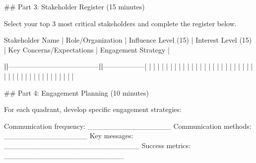 \documentclass[letterpaper,10pt,english]{sphinxmanual}
\begin{document}
\sphinxAtStartPar
\#\# Part 3: Stakeholder Register (15 minutes)

\sphinxAtStartPar
{} Select your top 3 most critical stakeholders and complete the register below.

\begin{DUlineblock}{0em}
\item[] Stakeholder Name | Role/Organization | Influence Level (1\sphinxhyphen{}5) | Interest Level (1\sphinxhyphen{}5) | Key Concerns/Expectations | Engagement Strategy |
\end{DUlineblock}

\sphinxAtStartPar
{\color{red}\bfseries{}|\sphinxhyphen{}\sphinxhyphen{}\sphinxhyphen{}\sphinxhyphen{}\sphinxhyphen{}\sphinxhyphen{}\sphinxhyphen{}\sphinxhyphen{}\sphinxhyphen{}\sphinxhyphen{}\sphinxhyphen{}\sphinxhyphen{}\sphinxhyphen{}\sphinxhyphen{}\sphinxhyphen{}\sphinxhyphen{}\sphinxhyphen{}\sphinxhyphen{}|}——————\sphinxhyphen{}{\color{red}\bfseries{}|\sphinxhyphen{}\sphinxhyphen{}\sphinxhyphen{}\sphinxhyphen{}\sphinxhyphen{}\sphinxhyphen{}\sphinxhyphen{}\sphinxhyphen{}\sphinxhyphen{}\sphinxhyphen{}\sphinxhyphen{}\sphinxhyphen{}\sphinxhyphen{}\sphinxhyphen{}\sphinxhyphen{}\sphinxhyphen{}\sphinxhyphen{}\sphinxhyphen{}\sphinxhyphen{}\sphinxhyphen{}\sphinxhyphen{}\sphinxhyphen{}|}———————{\color{red}\bfseries{}|\sphinxhyphen{}\sphinxhyphen{}\sphinxhyphen{}\sphinxhyphen{}\sphinxhyphen{}\sphinxhyphen{}\sphinxhyphen{}\sphinxhyphen{}\sphinxhyphen{}\sphinxhyphen{}\sphinxhyphen{}\sphinxhyphen{}\sphinxhyphen{}\sphinxhyphen{}\sphinxhyphen{}\sphinxhyphen{}\sphinxhyphen{}\sphinxhyphen{}\sphinxhyphen{}\sphinxhyphen{}\sphinxhyphen{}\sphinxhyphen{}\sphinxhyphen{}\sphinxhyphen{}\sphinxhyphen{}\sphinxhyphen{}\sphinxhyphen{}|}——————\sphinxhyphen{}|
| | | | | | |
| | | | | | |
| | | | | | |
| | | | | | |
| | | | | | |
| | | | | | |

\sphinxAtStartPar
\#\# Part 4: Engagement Planning (10 minutes)

\sphinxAtStartPar
{} For each quadrant, develop specific engagement strategies:

\sphinxAtStartPar
{}
\sphinxhyphen{} Communication frequency: \_\_\_\_\_\_\_\_\_\_\_\_\_\_\_\_
\sphinxhyphen{} Communication methods: \_\_\_\_\_\_\_\_\_\_\_\_\_\_\_\_
\sphinxhyphen{} Key messages: \_\_\_\_\_\_\_\_\_\_\_\_\_\_\_\_\_\_\_\_\_\_\_\_\_\_
\sphinxhyphen{} Success metrics: \_\_\_\_\_\_\_\_\_\_\_\_\_\_\_\_\_\_\_\_\_\_\_
\end{document}
